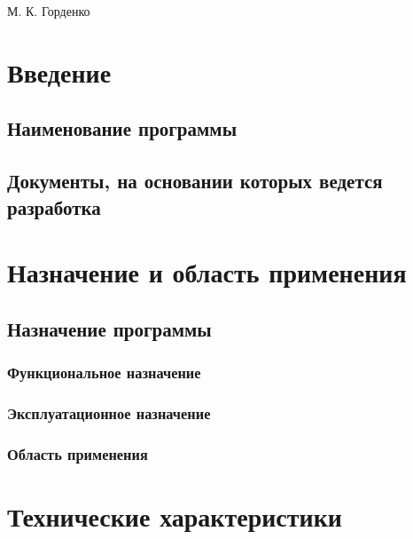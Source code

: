 \documentclass[a4paper,12pt]{article}
\begin{document}

    {М. К. Горденко}

    \firstPage
    \newpage
    \secondPage
    \newpage
    \thirdPage
    \newpage


    \section{Введение}

    \subsection{Наименование программы}

    \subsection{Документы, на основании которых ведется разработка}
    \newpage


    \section{Назначение и область применения}

    \subsection{Назначение программы }

    \subsubsection{Функциональное назначение }

    \subsubsection{Эксплуатационное назначение}

    \subsubsection{Область применения}

    \newpage


    \section{Технические характеристики}
\end{document}
